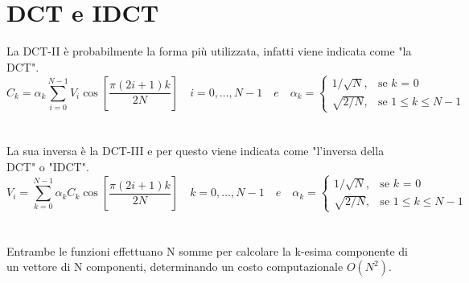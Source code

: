 \documentclass[a4paper,12pt]{report}
\begin{document}
\section{DCT e IDCT}
La DCT-II è probabilmente la forma più utilizzata, infatti viene indicata come "la DCT".\\
\[C_k = \alpha_k \sum_{i=0}^{N-1} V_i\cos \left[\frac{\pi \left(2i + 1\right) k }{2N}\right] \quad i = 0, \dots, N-1 \quad e \quad \alpha_k = \begin{cases} 1/\sqrt{N}, & \mbox{se } k\mbox{ = 0} \\ \sqrt{2/N}, & \mbox{se } \mbox{\(1 \leq k \leq N - 1\)} \end{cases}\]\\\\
La sua inversa è la DCT-III e per questo viene indicata come "l'inversa della DCT" o "IDCT".\\
\[V_i = \sum_{k=0}^{N-1} \alpha_k C_k \cos \left[\frac{\pi \left(2i + 1\right) k }{2N}\right] \quad k = 0, \dots, N-1 \quad e \quad \alpha_k = \begin{cases} 1/\sqrt{N}, & \mbox{se } k\mbox{ = 0} \\ \sqrt{2/N}, & \mbox{se } \mbox{\(1 \leq k \leq N - 1\)} \end{cases}\]\\\\

\noindent Entrambe le funzioni effettuano N somme per calcolare la k-esima componente di un vettore di N componenti, determinando un costo computazionale \( O(N^2)\).
\end{document}
